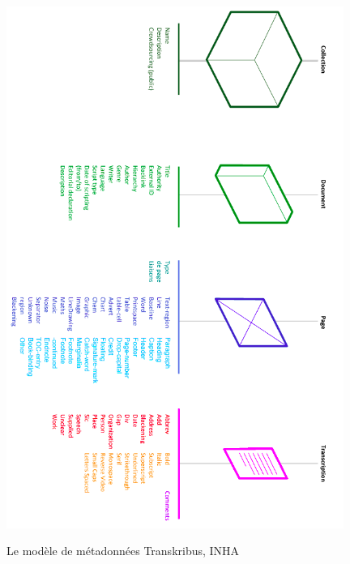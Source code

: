 \begin{figure}[ht]
    \centering
    \caption{Le modèle de métadonnées Transkribus, INHA}
    \includegraphics[width=11cm]{images/schema_modele_transkribus_inha1.png}
    \label{schema_modele_transkribus_inha1}
\end{figure}

